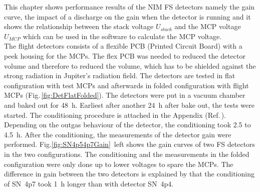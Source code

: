 	This chapter shows performance results of the NIM FS detectors namely the gain curve, the impact of a discharge on the gain when the detector is running and it shows the relationship between the stack voltage $U_{stack}$ and the MCP voltage $U_{MCP}$ which can be used in the software to calculate the MCP voltage.\\
	The flight detectors consists of a flexible PCB (Printed Circuit Board) with a peek housing for the MCPs. The flex PCB was needed to reduced the detector volume and therefore to reduced the volume, which has to be shielded against the strong radiation in Jupiter's radiation field. The detectors are tested in flat configuration with test MCPs and afterwards in folded configuration with flight MCPs (Fig.\,\ref{fig:DetFlatFolded}). The detectors were put in a vacuum chamber and baked out for 48~h. Earliest after another 24~h after bake out, the tests were started. The conditioning procedure is attached in the Appendix (Ref.\,). Depending on the outgas behaviour of the detector, the conditioning took 2.5 to 4.5~h. After the conditioning, the measurements of the detector gain were performed. Fig.\ref{fig:SN4p54p7Gain}~left shows the gain curves of two FS detectors in the two configurations. The conditioning and the measurements in the folded configuration were only done up to lower voltages to spare the MCPs. The difference in gain between the two detectors is explained by that the conditioning of SN~4p7 took 1~h longer than with detector SN~4p4.
	
